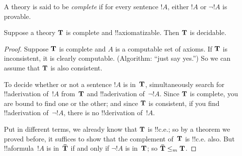 \documentclass[../../../include/open-logic-section]{subfiles}
\begin{document}


A theory is said to be {\em complete} if for every sentence $!A$,
either $!A$ or $\lnot !A$ is provable.

\begin{lem}
Suppose a theory $\mathbf{T}$ is complete and !!{axiomatizable}. Then
$\mathbf{T}$ is decidable.
\end{lem}

\begin{proof}
Suppose $\mathbf{T}$ is complete and $A$ is a computable set of axioms.
If $\mathbf{T}$ is inconsistent, it is clearly computable. (Algorithm: ``just
say yes.'') So we can assume that $\mathbf{T}$ is also consistent.

To decide whether or not a sentence $!A$ is in~$\mathbf{T}$,
simultaneously search for !!a{derivation} of~$!A$ from~$\mathbf{T}$ and
!!a{derivation} of~$\lnot !A$. Since $\mathbf{T}$ is complete, you are
bound to find one or the other; and since $\mathbf{T}$ is consistent, if you
find !!a{derivation} of~$\lnot !A$, there is no !!{derivation} of~$!A$.

Put in different terms, we already know that $\mathbf{T}$ is !!{c.e.}; so
by a theorem we proved before, it suffices to show that the complement
of~$\mathbf{T}$ is !!{c.e.} also. But !!a{formula}~$!A$ is in~$\mathbf{\bar
T}$ if and only if $\lnot !A$ is in~$\mathbf{T}$; so $\mathbf{\bar T} \leq_m
\mathbf{T}$.
\end{proof}
\end{document}
